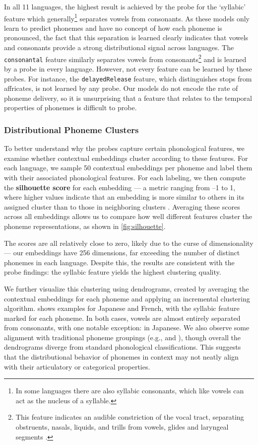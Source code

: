 In all 11 languages, the highest result is achieved by the probe for the `syllabic' feature which generally\footnote{In some languages there are also syllabic consonants, which like vowels can act as the nucleus of a syllable.} separates vowels from consonants. As these models only learn to predict phonemes and have no concept of how each phoneme is pronounced, the fact that this separation is learned clearly indicates that vowels and consonants provide a strong distributional signal across languages. The \texttt{consonantal} feature similarly separates vowels from consonants\footnote{This feature indicates an audible constriction of the vocal tract, separating obstruents, nasals, liquids, and trills from vowels, glides and laryngeal segments \citep{gussenhoven2017understanding}.} and is learned by a probe in every language. However, not every feature can be learned by these probes. For instance, the \texttt{delayedRelease} feature, which distinguishes stops from affricates, is not learned by any probe. Our models do not encode the rate of phoneme delivery, so it is unsurprising that a feature that relates to the temporal properties of phonemes is difficult to probe.

\subsubsection*{Distributional Phoneme Clusters}

To better understand why the probes capture certain phonological features, we examine whether contextual embeddings cluster according to these features. For each language, we sample 50 contextual embeddings per phoneme and label them with their associated phonological features. For each labeling, we then compute the \textbf{silhouette score} for each embedding --- a metric ranging from –1 to 1, where higher values indicate that an embedding is more similar to others in its assigned cluster than to those in neighboring clusters \citep{rousseeuw1987}. Averaging these scores across all embeddings allows us to compare how well different features cluster the phoneme representations, as shown in \cref{fig:silhouette}.

The scores are all relatively close to zero, likely due to the curse of dimensionality --- our embeddings have 256 dimensions, far exceeding the number of distinct phonemes in each language. Despite this, the results are consistent with the probe findings: the syllabic feature yields the highest clustering quality.

We further visualize this clustering using dendrograms, created by averaging the contextual embeddings for each phoneme and applying an incremental clustering algorithm.  shows examples for Japanese and French, with the syllabic feature marked for each phoneme. In both cases, vowels are almost entirely separated from consonants, with one notable exception:  in Japanese. We also observe some alignment with traditional phoneme groupings (e.g.,  and ), though overall the dendrograms diverge from standard phonological classifications. This suggests that the distributional behavior of phonemes in context may not neatly align with their articulatory or categorical properties.

